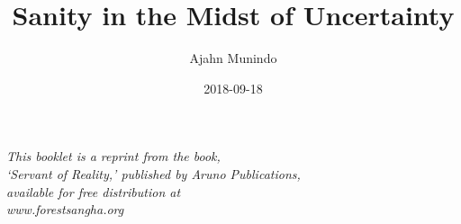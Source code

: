 \documentclass[
  final,
  babelLanguage=british,
  showtrims,
]{anecdote}
\title{Sanity in the Midst of Uncertainty}
\subtitle{}
\author{Ajahn Munindo}
\date{2018-09-18}
\begin{document}
\frontmatter

\ifdesktopversion
{}
\fi




%

\clearpage

\mbox{}\thispagestyle{empty}
\vfill

{\centering
\par}

\vfill

{\centering\itshape\fontsize{9}{13}\selectfont
This booklet is a reprint from the book,\\
`Servant of Reality,' published by Aruno Publications,\\
available for free distribution at\\
www.forestsangha.org
\par}

\clearpage\mbox{}\thispagestyle{empty}

\clearpage\mbox{}\thispagestyle{empty}

\mainmatter



\backmatter






\end{document}

